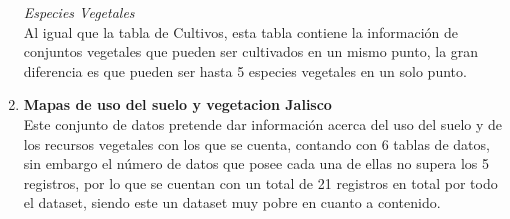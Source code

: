 \documentclass[10pt,letterpaper]{article}
\begin{document}
\begin{enumerate}
\textit{Especies Vegetales}\\
Al igual que la tabla de Cultivos, esta tabla contiene la informaci\'on de conjuntos vegetales que pueden ser cultivados en un mismo punto, la gran diferencia es que pueden ser hasta 5 especies vegetales en un solo punto.

\item \textbf{Mapas de uso del suelo y vegetacion Jalisco}\\
Este conjunto de datos pretende dar informaci\'on acerca del uso del suelo y de los recursos vegetales con los que se cuenta, contando con 6 tablas de datos, sin embargo el n\'umero de datos que posee cada una de ellas no supera los 5 registros, por lo que se cuentan con un total de 21 registros en total por todo el dataset, siendo este un dataset muy pobre en cuanto a contenido.
\end{enumerate}

%
%
\end{document}
